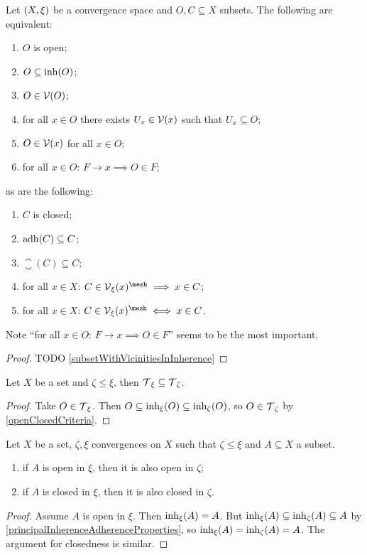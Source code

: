 \begin{lemma} \label{openClosedCriteria}
Let $\sSet{X,\xi}$ be a convergence space and $O,C\subseteq X$ subsets. The following are equivalent:
\begin{enumerate}
\item $O$ is open;
\item $O\subseteq \operatorname{inh}(O)$;
\item $O\in \operatorname{\mathcal{V}}(O)$;
\item for all $x\in O$ there exists $U_x\in \operatorname{\mathcal{V}}(x)$ such that $U_x\subseteq O$;
\item $O\in \operatorname{\mathcal{V}}(x)$ for all $x\in O$;
\item for all $x\in O$: $F\to x \implies O\in F$;
\end{enumerate}
as are the following:
\begin{enumerate}
\item $C$ is closed;
\item $\operatorname{adh}(C)\subseteq C$;
\item $\closure(C)\subseteq C$;
\item for all $x\in X$: $C\in \vicinities_\xi(x)^\mesh \implies x\in C$;
\item for all $x\in X$: $C\in \vicinities_\xi(x)^\mesh \iff x\in C$.
\end{enumerate}
\end{lemma}
Note ``for all $x\in O$: $F\to x \implies O\in F$'' seems to be the most important.
\begin{proof}
TODO \ref{subsetWithVicinitiesInInherence}
\end{proof}

\begin{lemma} \label{topologyMonotoneInConvergence}
Let $X$ be a set and $\zeta \leq \xi$, then $\operatorname{\mathcal{T}}_{\xi} \subseteq \operatorname{\mathcal{T}}_{\zeta}$.
\end{lemma}
\begin{proof}
Take $O\in \operatorname{\mathcal{T}}_{\xi}$. Then $O\subseteq \operatorname{inh}_\xi(O) \subseteq \operatorname{inh}_\zeta(O)$, so $O\in \operatorname{\mathcal{T}}_\zeta$ by \ref{openClosedCriteria}.
\end{proof}

\begin{lemma} \label{openClosedConvergenceInclusions}
Let $X$ be a set, $\zeta, \xi$ convergences on $X$ such that $\zeta\leq\xi$ and $A\subseteq X$ a subset.
\begin{enumerate}
\item if $A$ is open in $\xi$, then it is also open in $\zeta$;
\item if $A$ is closed in $\xi$, then it is also closed in $\zeta$.
\end{enumerate}
\end{lemma}
\begin{proof}
Assume $A$ is open in $\xi$. Then $\operatorname{inh}_\xi(A) = A$. But $\operatorname{inh}_\xi(A) \subseteq \operatorname{inh}_\zeta(A) \subseteq A$ by \ref{principalInherenceAdherenceProperties}, so $\operatorname{inh}_\xi(A) = \operatorname{inh}_\zeta(A) = A$. The argument for closedness is similar.
\end{proof}

